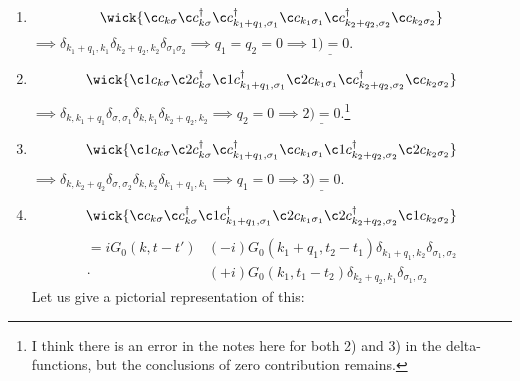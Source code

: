 \begin{enumerate}[1)]
	\item 
	\begin{equation} 
	\wick{\c c_{k\sigma} \c c_{k\sigma}^\dagger \c c_{k_1+q_1, \sigma_1}^\dagger \c c_{k_1\sigma_1} \c c_{k_2+q_2, \sigma_2}^\dagger \c c_{k_2\sigma_2}}
	\end{equation}
	$\implies \delta_{k_1 + q_1, k_1}\delta_{k_2 + q_2, k_2}\delta_{\sigma_1\sigma_2} \implies q_1=q_2 = 0 \implies \underline{1) = 0}.$
	\item
	\begin{equation} 
	\wick{\c1 c_{k\sigma} \c2 c_{k\sigma}^\dagger \c1 c_{k_1+q_1, \sigma_1}^\dagger \c2 c_{k_1\sigma_1} \c c_{k_2+q_2, \sigma_2}^\dagger \c c_{k_2\sigma_2}}
	\end{equation}
	$\implies \delta_{k, k_1+q_1}\delta_{\sigma, \sigma_1}\delta_{k, k_1}\delta_{k_2 + q_2, k_2} \implies q_2 = 0 \implies \underline{2) = 0}$.\footnote{I think there is an error in the notes here for both 2) and 3) in the delta-functions, but the conclusions of zero contribution remains.}
	\item 
	\begin{equation} 
	\wick{\c1 c_{k\sigma} \c2 c_{k\sigma}^\dagger \c c_{k_1+q_1, \sigma_1}^\dagger \c c_{k_1\sigma_1} \c1 c_{k_2+q_2, \sigma_2}^\dagger \c2 c_{k_2\sigma_2}}
	\end{equation}
	$\implies \delta_{k, k_2 +q_2}\delta_{\sigma, \sigma_2}\delta_{k, k_2}\delta_{k_1+q_1, k_1} \implies q_1 = 0 \implies \underline{3) = 0}$.
	\item
	\begin{equation} 
	\wick{\c c_{k\sigma} \c c_{k\sigma}^\dagger \c1 c_{k_1+q_1, \sigma_1}^\dagger \c2 c_{k_1\sigma_1} \c2 c_{k_2+q_2, \sigma_2}^\dagger \c1 c_{k_2\sigma_2}}
	\end{equation}
	\begin{align*} 
	=iG_0(k, t-t')&(-i)G_0(k_1+q_1, t_2-t_1)\delta_{k_1+q_1, k_2}\delta_{\sigma_1, \sigma_2} \\
	\cdot&(+i)G_0(k_1, t_1-t_2)\delta_{k_2+q_2, k_1}\delta_{\sigma_1, \sigma_2}
	\end{align*}
	Let us give a pictorial representation of this:
	\begin{center}
\end{center}
\end{enumerate}
